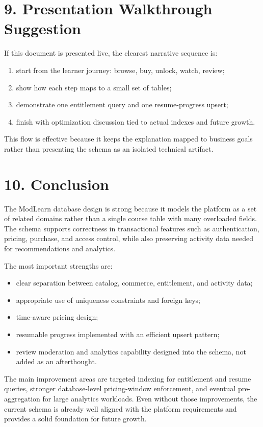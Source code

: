 \documentclass[11pt,a4paper]{article}
\begin{document}
\section*{9. Presentation Walkthrough Suggestion}
If this document is presented live, the clearest narrative sequence is:

\begin{enumerate}[leftmargin=1.5em]
	\item start from the learner journey: browse, buy, unlock, watch, review;
	\item show how each step maps to a small set of tables;
	\item demonstrate one entitlement query and one resume-progress upsert;
	\item finish with optimization discussion tied to actual indexes and future growth.
\end{enumerate}

This flow is effective because it keeps the explanation mapped to business goals rather than presenting the schema as an isolated technical artifact.

\section*{10. Conclusion}
The ModLearn database design is strong because it models the platform as a set of related domains rather than a single course table with many overloaded fields. The schema supports correctness in transactional features such as authentication, pricing, purchase, and access control, while also preserving activity data needed for recommendations and analytics.

The most important strengths are:

\begin{itemize}[leftmargin=1.5em]
	\item clear separation between catalog, commerce, entitlement, and activity data;
	\item appropriate use of uniqueness constraints and foreign keys;
	\item time-aware pricing design;
	\item resumable progress implemented with an efficient upsert pattern;
	\item review moderation and analytics capability designed into the schema, not added as an afterthought.
\end{itemize}

The main improvement areas are targeted indexing for entitlement and resume queries, stronger database-level pricing-window enforcement, and eventual pre-aggregation for large analytics workloads. Even without those improvements, the current schema is already well aligned with the platform requirements and provides a solid foundation for future growth.
\end{document}
